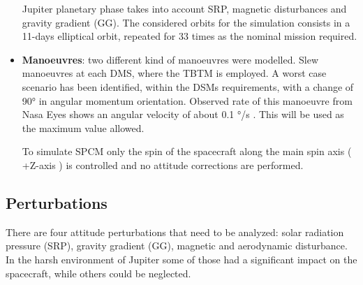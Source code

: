 \begin{itemize}
    Jupiter planetary phase takes into account SRP, magnetic disturbances and gravity gradient (GG). The considered orbits for the simulation consists in a 11-days elliptical orbit, repeated for 33 times as the nominal mission required. 

    \item \textbf{Manoeuvres}: two different kind of manoeuvres were modelled. Slew manoeuvres at each DMS, where the TBTM is employed. A worst case scenario has been identified, within the DSMs requirements, with a change of 90° in angular momentum orientation. Observed rate of this manoeuvre from Nasa Eyes\cite{nasa_eyes} shows an angular velocity of about 0.1 °/s \cite{slides_michele}. This will be used as the maximum value allowed. 
    
    To simulate SPCM only the spin of the spacecraft along the main spin axis ( +Z-axis ) is controlled and no attitude corrections are performed.      


\end{itemize}

\subsection{Perturbations}
\label{subsec:perturbations}

There are four attitude perturbations that need to be analyzed: solar radiation pressure (SRP), gravity gradient (GG), magnetic and aerodynamic disturbance. In the harsh environment of Jupiter some of those had a significant impact on the spacecraft, while others could be neglected. 


